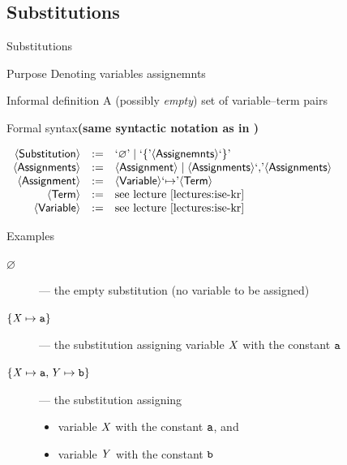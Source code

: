 \documentclass[presentation]{beamer}\mode<presentation>{\usetheme{AMSBolognaFC}}
\begin{document}
\subsection{Substitutions}

\begin{frame}[allowframebreaks]{Substitutions}
    \begin{block}{Purpose}\centering
        Denoting variables assignemnts
    \end{block}
    \begin{block}{Informal definition}
        A (possibly \emph{empty}) set of \alert{variable--term} pairs
    \end{block}
    \begin{alertblock}{Formal syntax\hfill\textbf{\footnotesize(same syntactic notation as in \cite{lectures:ise-kr})}}
        \begin{center}
            $\begin{array}{rcl}
                \mathsf{\left\langle Substitution\right\rangle} & := & \text{`}\mathit{\varnothing}\text{'} \mid \text{`}\mathit{\{}\text{'} \mathsf{\left\langle Assignemnts\right\rangle} \text{`}\mathit{\}}\text{'}
                \\
                \mathsf{\left\langle Assignments\right\rangle} & := & \mathsf{\left\langle Assignment\right\rangle} \mid \mathsf{\left\langle Assignments\right\rangle} \text{`}\mathit{,}\text{'} \mathsf{\left\langle Assignments\right\rangle}
                \\
                \mathsf{\left\langle Assignment\right\rangle} & := & \mathsf{\left\langle Variable\right\rangle} \text{`}\mathit{\mapsto}\text{'} \mathsf{\left\langle Term\right\rangle}
                \\
                \mathsf{\left\langle Term\right\rangle} & := & \text{see lecture \cite{lectures:ise-kr}}
                \\
                \mathsf{\left\langle Variable\right\rangle} & := & \text{see lecture \cite{lectures:ise-kr}}
            \end{array}$
        \end{center}
    \end{alertblock}

    \begin{exampleblock}{Examples}
        \begin{description}
            \item[$\varnothing$] --- the empty substitution (no variable to be assigned)
            \item[$\{ \mathit{X} \mapsto \mathtt{a} \}$] --- the substitution assigning variable $\mathit{X}$ with the constant $\mathtt{a}$
            \item[$\{ \mathit{X} \mapsto \mathtt{a}, \mathit{Y} \mapsto \mathtt{b} \}$] --- the substitution assigning 
            \begin{itemize}
                \item variable $\mathit{X}$ with the constant $\mathtt{a}$, and
                \item variable $\mathit{Y}$ with the constant $\mathtt{b}$ 
            \end{itemize} 
        \end{description}
    \end{exampleblock}
\end{frame}
\end{document}

